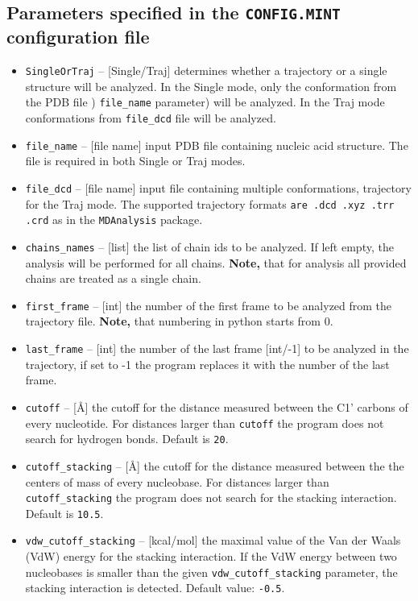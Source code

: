 \documentclass[12pt]{article}
\begin{document}
\subsection{Parameters specified in the \texttt{CONFIG.MINT} configuration file}
\begin{itemize}
\item \texttt{SingleOrTraj} -- [Single/Traj] determines whether a trajectory or a single structure will be analyzed. In the Single mode, only the conformation from the PDB file ) \texttt{file\_name} parameter) will be analyzed. In the Traj mode conformations from \texttt{file\_dcd} file will be analyzed. 
\item \texttt{file\_name} -- [file name] input PDB file containing nucleic acid structure. The file is required in both Single or Traj modes.
\item \texttt{file\_dcd} -- [file name] input file containing multiple conformations, trajectory for the Traj mode. The supported trajectory formats \texttt{are .dcd .xyz .trr .crd} as in the \texttt{MDAnalysis} package.  
\item \texttt{chains\_names} -- [list] the list of chain ids to be analyzed. If left empty, the analysis will be performed for all chains. \textbf{Note,} that for analysis all provided chains are treated as a single chain.
\item \texttt{first\_frame} -- [int] the number of the first frame to be analyzed from the trajectory file. {\bf Note,} that numbering in python starts from 0.
\item \texttt{last\_frame} -- [int] the number of the last frame [int/-1] to be analyzed in the trajectory, if set to -1 the program replaces it with the number of the last frame.
\item \texttt{cutoff} -- [\AA] the cutoff for the distance measured between the C1' carbons of every nucleotide. For distances larger than \texttt{cutoff} the program does not search for hydrogen bonds. Default is \texttt{20}.
\item \texttt{cutoff\_stacking} -- [\AA] the cutoff for the distance  measured between the the centers of mass of every nucleobase. For distances larger than \texttt{cutoff\_stacking} the program does not search for the stacking interaction. Default is \texttt{10.5}.
\item \texttt{vdw\_cutoff\_stacking} --  [kcal/mol] the maximal value of the Van der Waals (VdW) energy for the stacking interaction. If the VdW energy between two nucleobases is smaller than the given \texttt{vdw\_cutoff\_stacking} parameter, the stacking interaction is detected. Default value: \texttt{-0.5}.

\end{itemize}
\end{document}
